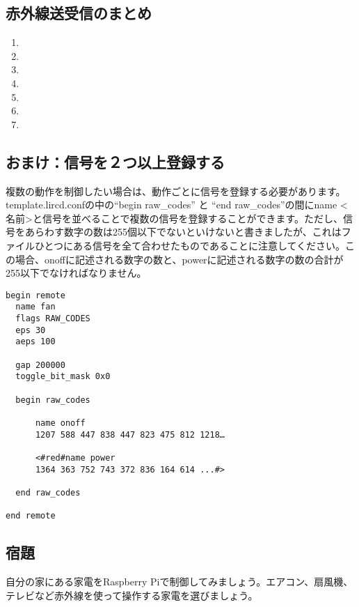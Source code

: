 \subsection{赤外線送受信のまとめ}
\begin{enumerate}
\item {}
\item {}
\item {}
\item {}
\item {}
\item {}
\item {}
\end{enumerate}

\subsection{おまけ：信号を２つ以上登録する}
複数の動作を制御したい場合は、動作ごとに信号を登録する必要があります。template.lircd.confの中の“begin raw\_codes” と “end raw\_codes”の間にname <名前>と信号を並べることで複数の信号を登録することができます。ただし、信号をあらわす数字の数は255個以下でないといけないと書きましたが、これはファイルひとつにある信号を全て合わせたものであることに注意してください。この場合、onoffに記述される数字の数と、powerに記述される数字の数の合計が255以下でなければなりません。\\

\begin{lstlisting}[caption=２つの信号を登録するときのtemplate.lircd.comf,label=２つの信号を登録するときのtemplate.lircd.comf]
begin remote
  name fan
  flags RAW_CODES
  eps 30
  aeps 100

  gap 200000
  toggle_bit_mask 0x0

  begin raw_codes

      name onoff
      1207 588 447 838 447 823 475 812 1218…

      <#red#name power
      1364 363 752 743 372 836 164 614 ...#>

  end raw_codes

end remote
\end{lstlisting}

\subsection{宿題}
自分の家にある家電をRaspberry Piで制御してみましょう。エアコン、扇風機、テレビなど赤外線を使って操作する家電を選びましょう。